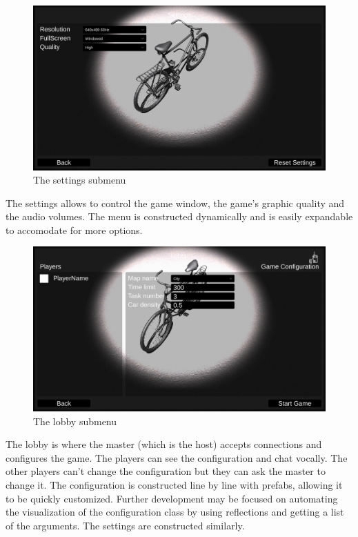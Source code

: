 \documentclass[12pt]{article}
\begin{document}
\begin{figure}[H]
\includegraphics[width=\textwidth]{settings}
\caption{The settings submenu}
\end{figure}
The settings allows to control the game window, the game's graphic quality and the audio volumes. The menu is constructed dynamically and is easily expandable to accomodate for more options.
\begin{figure}[H]
\includegraphics[width=\textwidth]{lobby}
\caption{The lobby submenu}
\end{figure}
The lobby is where the master (which is the host) accepts connections and configures the game. The players can see the configuration and chat vocally. The other players can't change the configuration but they can ask the master to change it. The configuration is constructed line by line with prefabs, allowing it to be quickly customized. Further development may be focused on automating the visualization of the configuration class by using reflections and getting a list of the arguments. The settings are constructed similarly.
\end{document}
